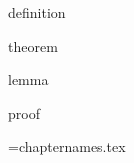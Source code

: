 
\newif\ifInBook \InBooktrue
\let\textbookref\ref

\newcommand\slidenewline{}\let\slidebreak\slidenewline


\newtheorem{remark}{Remark}
\expandafter\ifx\csname definition\endcsname\relax
    \newtheorem{definition}{Definition}
\fi
\expandafter\ifx\csname theorem\endcsname\relax
    \newtheorem{theorem}{Theorem}
\fi
\expandafter\ifx\csname lemma\endcsname\relax
    \newtheorem{lemma}{Lemma}
\fi
\expandafter\ifx\csname proof\endcsname\relax
 \newenvironment{proof}{\begin{quotation}\small\sl\noindent Proof.\ \ignorespaces}
     {\end{quotation}}
\fi


\newwrite\nx
\newwrite\chapterlist
\newif\ifListSources \ListSourcesfalse
\openout\chapterlist=chapternames.tex
\newcommand\CHAPTER[2]{
  \Level 0 {#1}\label{ch:#2}
  \def\chapshortname{#2}

  \addchaptersource{header}%

  \SetBaseLevel 1 
  \SetBaseLevel 0 

  \ifListSources\listchaptersources\chapshortname\fi

  \write\chapterlist{\chapshortname}
  \openout\nx=exercises/\chapshortname-nx.tex
  \write\nx{\arabic{excounter}}
  \closeout\nx

  \SetBaseLevel 0
}
\newcommand\TUTORIAL[2]{
  \Level 0 {#1}\label{tut:#2}
  \def\chapshortname{#2}

  \addchaptersource{header}%

  \SetBaseLevel 1  \TutorialsSubDir/#2
  \SetBaseLevel 0 

  \ifListSources\listchaptersources\chapshortname\fi

  \write\chapterlist{\chapshortname}
  \openout\nx=exercises/\chapshortname-nx.tex
  \write\nx{\arabic{excounter}}
  \closeout\nx

  \SetBaseLevel 0
}

